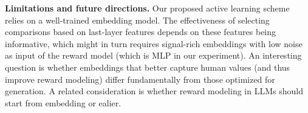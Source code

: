 \textbf{Limitations and future directions.} Our proposed active learning scheme relies on a well-trained embedding model. The effectiveness of selecting comparisons based on last-layer features depends on these features being informative, which might in turn requires signal-rich embeddings with low noise as input of the reward model (which is MLP in our experiment). An interesting question is whether embeddings that better capture human values (and thus improve reward modeling) differ fundamentally from those optimized for generation. A related consideration is whether reward modeling in LLMs should start from embedding or ealier. 